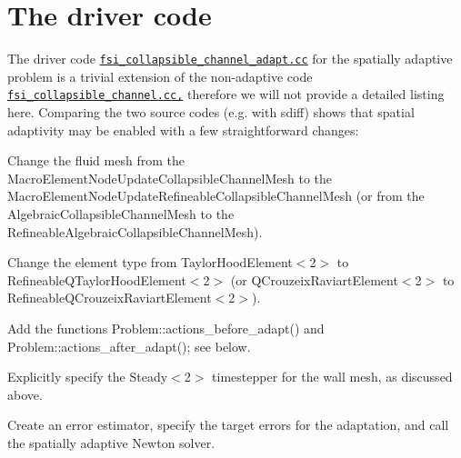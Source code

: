 \hypertarget{index_driver}{}\section{The driver code}\label{index_driver}
The driver code \href{../../../../demo_drivers/interaction/fsi_collapsible_channel/fsi_collapsible_channel_adapt.cc}{\tt fsi\+\_\+collapsible\+\_\+channel\+\_\+adapt.\+cc} for the spatially adaptive problem is a trivial extension of the non-\/adaptive code \href{../../../../demo_drivers/interaction/fsi_collapsible_channel/fsi_collapsible_channel.cc}{\tt fsi\+\_\+collapsible\+\_\+channel.\+cc,} therefore we will not provide a detailed listing here. Comparing the two source codes (e.\+g. with {\ttfamily sdiff}) shows that spatial adaptivity may be enabled with a few straightforward changes\+:
\begin{DoxyItemize}
\item Change the fluid mesh from the {\ttfamily Macro\+Element\+Node\+Update\+Collapsible\+Channel\+Mesh} to the {\ttfamily Macro\+Element\+Node\+Update\+Refineable\+Collapsible\+Channel\+Mesh} (or from the {\ttfamily Algebraic\+Collapsible\+Channel\+Mesh} to the {\ttfamily Refineable\+Algebraic\+Collapsible\+Channel\+Mesh}). ~\newline
~\newline

\item Change the element type from {\ttfamily Taylor\+Hood\+Element$<$2$>$} to {\ttfamily Refineable\+Q\+Taylor\+Hood\+Element$<$2$>$} (or {\ttfamily Q\+Crouzeix\+Raviart\+Element$<$2$>$} to {\ttfamily Refineable\+Q\+Crouzeix\+Raviart\+Element$<$2$>$}). ~\newline
~\newline

\item Add the functions {\ttfamily Problem\+::actions\+\_\+before\+\_\+adapt()} and {\ttfamily Problem\+::actions\+\_\+after\+\_\+adapt()}; see below. ~\newline
~\newline

\item Explicitly specify the {\ttfamily Steady$<$2$>$} timestepper for the wall mesh, as discussed above. ~\newline
~\newline

\item Create an error estimator, specify the target errors for the adaptation, and call the spatially adaptive Newton solver.
\end{DoxyItemize}

